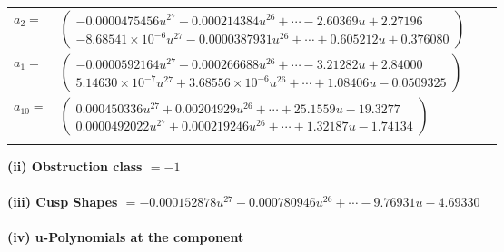 \documentclass[1p]{elsarticle_modified}
\theoremstyle{definition}
\begin{document}
\begin{tabular}{m{7pt} m{180pt} m{7pt} m{180pt} }
\flushright $a_{2}=$&$\begin{pmatrix}-0.0000475456 u^{27}-0.000214384 u^{26}+\cdots-2.60369 u+2.27196\\-8.68541\times10^{-6} u^{27}-0.0000387931 u^{26}+\cdots+0.605212 u+0.376080\end{pmatrix}$ \\
\flushright $a_{1}=$&$\begin{pmatrix}-0.0000592164 u^{27}-0.000266688 u^{26}+\cdots-3.21282 u+2.84000\\5.14630\times10^{-7} u^{27}+3.68556\times10^{-6} u^{26}+\cdots+1.08406 u-0.0509325\end{pmatrix}$ \\
\flushright $a_{10}=$&$\begin{pmatrix}0.000450336 u^{27}+0.00204929 u^{26}+\cdots+25.1559 u-19.3277\\0.0000492022 u^{27}+0.000219246 u^{26}+\cdots+1.32187 u-1.74134\end{pmatrix}$\\&\end{tabular}
\flushleft \textbf{(ii) Obstruction class $= -1$}\\~\\
\flushleft \textbf{(iii) Cusp Shapes $= -0.000152878 u^{27}-0.000780946 u^{26}+\cdots-9.76931 u-4.69330$}\\~\\
\newpage\renewcommand{\arraystretch}{1}
\flushleft \textbf{(iv) u-Polynomials at the component}\newline \\
\end{document}
